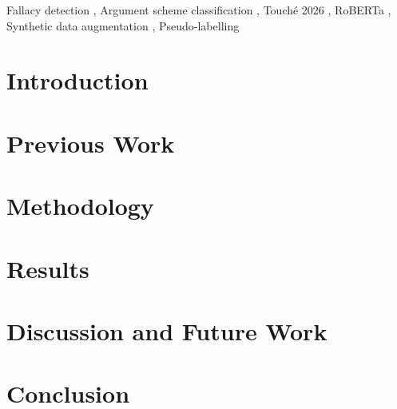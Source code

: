 \documentclass{ceurart}
\begin{document}
\begin{keywords}
  Fallacy detection \sep
  Argument scheme classification \sep
  Touch\'{e} 2026 \sep
  RoBERTa \sep
  Synthetic data augmentation \sep
  Pseudo-labelling
\end{keywords}

\maketitle

\section{Introduction}
\label{sec:intro}


\section{Previous Work}
\label{sec:background}


\section{Methodology}
\label{sec:system}


\section{Results}
\label{sec:results}


\section{Discussion and Future Work}
\label{sec:discussion}


\section{Conclusion}
\label{sec:conclusion}

\end{document}
